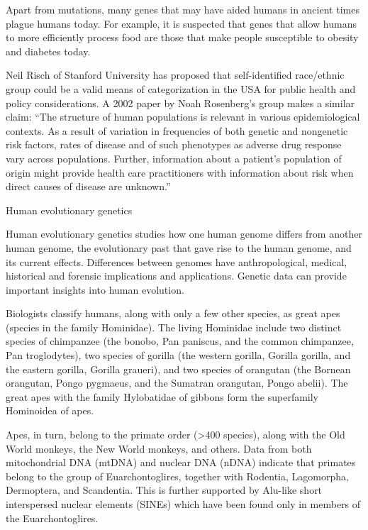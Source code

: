 Apart from mutations, many genes that may have aided humans in ancient times plague humans today. For example, it is suspected that genes that allow humans to more efficiently process food are those that make people susceptible to obesity and diabetes today.

Neil Risch of Stanford University has proposed that self-identified race/ethnic group could be a valid means of categorization in the USA for public health and policy considerations. A 2002 paper by Noah Rosenberg's group makes a similar claim: ``The structure of human populations is relevant in various epidemiological contexts. As a result of variation in frequencies of both genetic and nongenetic risk factors, rates of disease and of such phenotypes as adverse drug response vary across populations. Further, information about a patient's population of origin might provide health care practitioners with information about risk when direct causes of disease are unknown.''

Human evolutionary genetics

Human evolutionary genetics studies how one human genome differs from another human genome, the evolutionary past that gave rise to the human genome, and its current effects. Differences between genomes have anthropological, medical, historical and forensic implications and applications. Genetic data can provide important insights into human evolution.

Biologists classify humans, along with only a few other species, as great apes (species in the family Hominidae). The living Hominidae include two distinct species of chimpanzee (the bonobo, Pan paniscus, and the common chimpanzee, Pan troglodytes), two species of gorilla (the western gorilla, Gorilla gorilla, and the eastern gorilla, Gorilla graueri), and two species of orangutan (the Bornean orangutan, Pongo pygmaeus, and the Sumatran orangutan, Pongo abelii). The great apes with the family Hylobatidae of gibbons form the superfamily Hominoidea of apes.

Apes, in turn, belong to the primate order (\textgreater{}400 species), along with the Old World monkeys, the New World monkeys, and others. Data from both mitochondrial DNA (mtDNA) and nuclear DNA (nDNA) indicate that primates belong to the group of Euarchontoglires, together with Rodentia, Lagomorpha, Dermoptera, and Scandentia. This is further supported by Alu-like short interspersed nuclear elements (SINEs) which have been found only in members of the Euarchontoglires.

